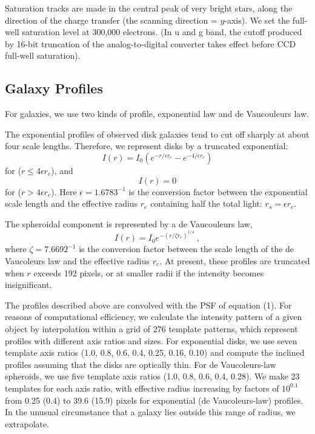 Saturation tracks are made in the central peak of very bright stars, along 
the direction of the charge transfer (the scanning direction = $y$-axis).
We set the full-well saturation level at 300,000 electrons.
(In u and g band, the cutoff produced by 16-bit truncation of the 
analog-to-digital converter takes effect before CCD full-well saturation).

\vspace{10pt}
\subsection{ Galaxy Profiles }

For galaxies, we use two kinds of profile, exponential law and de Vaucouleurs
law.  

The exponential profiles of observed disk galaxies tend to cut off sharply
at about four scale lengths.  Therefore, we represent disks by a 
truncated exponential:
\begin{equation}
I(r) = I_0 (e^{-{r}/{\epsilon r_e}} - e^{-{4}/{\epsilon r_e}})  
\end{equation}
for ($r \leq 4 \epsilon r_e$), and
\begin{equation}
I(r) = 0  
\end{equation}
for ($r > 4 \epsilon r_e$).
Here $\epsilon = 1.6783^{-1}$ is the conversion factor between the 
exponential scale length and the effective radius $r_e$ containing half
the total light: $r_s=\epsilon r_e$.

The spheroidal component is represented by a de Vaucouleurs law,
\begin{equation}
I(r) = I_0 e^{-({r}/{\zeta r_e})^{1/4}} ~,
\end{equation}
where $\zeta = 7.6692^{-1}$ is the conversion factor between the scale
length of the de Vaucoleurs law and the effective radius $r_e$.
At present, these profiles are truncated when $r$ exceeds 192 pixels,
or at smaller radii if the intensity becomes insignificant.

The profiles described above are convolved with the PSF of equation (1).
For reasons of computational efficiency, we calculate the intensity
pattern of a given object by interpolation within a grid of 276 template
patterns, which represent profiles with different axis ratios and sizes.
For exponential disks, we use seven template axis ratios
(1.0, 0.8, 0.6, 0.4, 0.25, 0.16, 0.10) and compute the inclined profiles
assuming that the disks are optically thin.
For de Vaucoleurs-law spheroids, we use five template axis ratios
(1.0, 0.8, 0.6, 0.4, 0.28).  We make 23 templates for each axis ratio,
with effective radius increasing by factors of $10^{0.1}$ from
0.25 (0.4) to 39.6 (15.9) pixels for exponential (de Vaucoleurs-law) profiles.
In the unusual circumstance that a galaxy lies outside this range of radius,
we extrapolate.

